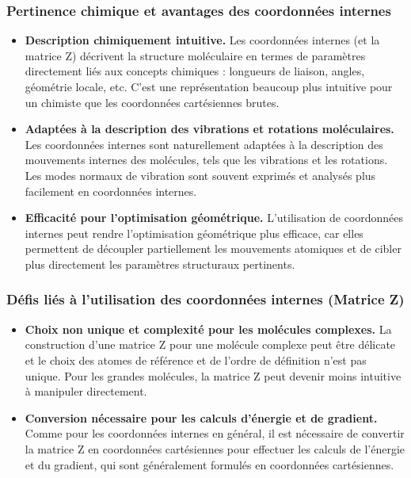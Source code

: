 \documentclass[12pt,a4paper]{article} %
\numberwithin{equation}{section} %
\numberwithin{figure}{section} %
\numberwithin{table}{section} %
\begin{document}
\subsubsection{Pertinence chimique et avantages des coordonnées internes}

\begin{itemize}
 \item \textbf{Description chimiquement intuitive.} Les coordonnées internes (et la matrice Z) décrivent la structure moléculaire en termes de paramètres directement liés aux concepts chimiques : longueurs de liaison, angles, géométrie locale, etc. C'est une représentation beaucoup plus intuitive pour un chimiste que les coordonnées cartésiennes brutes.
 
 \item \textbf{Adaptées à la description des vibrations et rotations moléculaires.} Les coordonnées internes sont naturellement adaptées à la description des mouvements internes des molécules, tels que les vibrations et les rotations. Les modes normaux de vibration sont souvent exprimés et analysés plus facilement en coordonnées internes.
 
 \item \textbf{Efficacité pour l'optimisation géométrique.} L'utilisation de coordonnées internes peut rendre l'optimisation géométrique plus efficace, car elles permettent de découpler partiellement les mouvements atomiques et de cibler plus directement les paramètres structuraux pertinents.
\end{itemize}

\subsubsection{Défis liés à l'utilisation des coordonnées internes (Matrice Z)}

\begin{itemize}
 \item \textbf{Choix non unique et complexité pour les molécules complexes.} La construction d'une matrice Z pour une molécule complexe peut être délicate et le choix des atomes de référence et de l'ordre de définition n'est pas unique. Pour les grandes molécules, la matrice Z peut devenir moins intuitive à manipuler directement.
 
 \item \textbf{Conversion nécessaire pour les calculs d'énergie et de gradient.} Comme pour les coordonnées internes en général, il est nécessaire de convertir la matrice Z en coordonnées cartésiennes pour effectuer les calculs de l'énergie et du gradient, qui sont généralement formulés en coordonnées cartésiennes.
\end{itemize}
\end{document}

